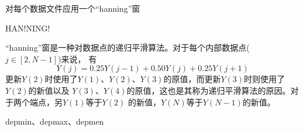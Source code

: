 \label{cmd:hanning}

对每个数据文件应用一个``hanning''窗

\begin{SACSTX}
HAN!NING!
\end{SACSTX}

``hanning''窗是一种对数据点的递归平滑算法。对于每个内部数据点($j\in[2,N-1]$)来说，
有
\[
    Y(j)=0.25Y(j-1)+0.50Y(j)+0.25Y(j+1)
\]
更新$Y(2)$时使用了$Y(1)$、$Y(2)$、$Y(3)$的原值，而更新$Y(3)$时则使用了$Y(2)$的新值以及
$Y(3)$、$Y(4)$的原值，这也是其称为递归平滑算法的原因。对于两个端点，另$Y(1)$等于$Y(2)$
的新值，$Y(N)$等于$Y(N-1)$的新值。

depmin、depmax、depmen

